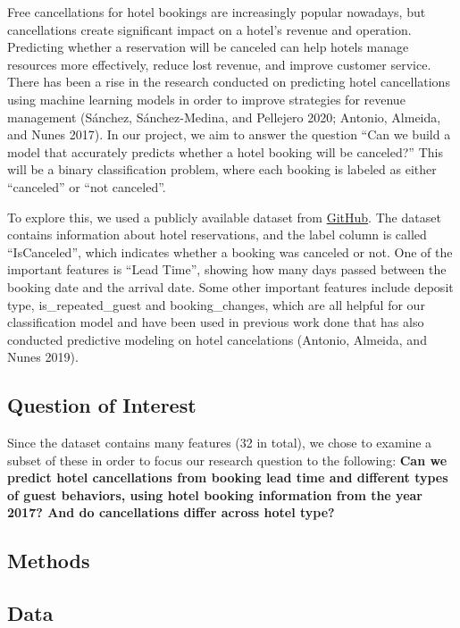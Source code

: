 \documentclass[
  letterpaper,
  DIV=11,
  numbers=noendperiod]{scrartcl}
\begin{document}
Free cancellations for hotel bookings are increasingly popular nowadays,
but cancellations create significant impact on a hotel's revenue and
operation. Predicting whether a reservation will be canceled can help
hotels manage resources more effectively, reduce lost revenue, and
improve customer service. There has been a rise in the research
conducted on predicting hotel cancellations using machine learning
models in order to improve strategies for revenue management (Sánchez,
Sánchez-Medina, and Pellejero 2020; Antonio, Almeida, and Nunes 2017).
In our project, we aim to answer the question ``Can we build a model
that accurately predicts whether a hotel booking will be canceled?''
This will be a binary classification problem, where each booking is
labeled as either ``canceled'' or ``not canceled''.

To explore this, we used a publicly available dataset from
\href{https://raw.githubusercontent.com/manthangandhi/hotel_cancellation_prediction/refs/heads/main/data/hotel_bookings.csv}{GitHub}.
The dataset contains information about hotel reservations, and the label
column is called ``IsCanceled'', which indicates whether a booking was
canceled or not. One of the important features is ``Lead Time'', showing
how many days passed between the booking date and the arrival date. Some
other important features include deposit type, is\_repeated\_guest and
booking\_changes, which are all helpful for our classification model and
have been used in previous work done that has also conducted predictive
modeling on hotel cancelations (Antonio, Almeida, and Nunes 2019).

\subsection{Question of Interest}\label{question-of-interest}

Since the dataset contains many features (32 in total), we chose to
examine a subset of these in order to focus our research question to the
following: \textbf{Can we predict hotel cancellations from booking lead
time and different types of guest behaviors, using hotel booking
information from the year 2017? And do cancellations differ across hotel
type?}

\subsection{Methods}\label{methods}

\subsection{Data}\label{data}
\end{document}
